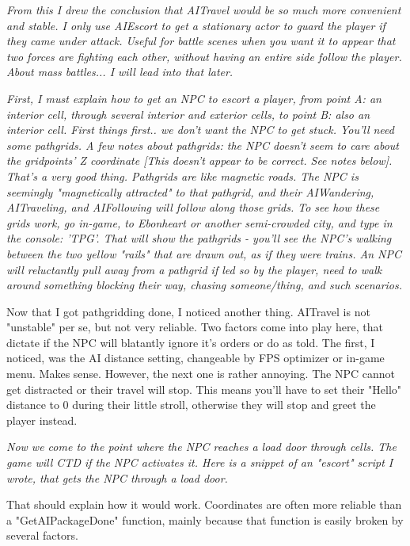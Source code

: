 \documentclass[
]{article}
\begin{document}
\emph{From this I drew the conclusion that AITravel would be so much
more convenient and stable. I only use AIEscort to get a stationary
actor to guard the player if they came under attack. Useful for battle
scenes when you want it to appear that two forces are fighting each
other, without having an entire side follow the player. About mass
battles... I will lead into that later.}

\emph{\hfill\break
First, I must explain how to get an NPC to escort a player, from point
A: an interior cell, through several interior and exterior cells, to
point B: also an interior cell. First things first.. we don't want the
NPC to get stuck. You'll need some pathgrids. A few notes about
pathgrids: the NPC doesn't seem to care about the gridpoints' Z
coordinate {[}This doesn't appear to be correct. See notes below{]}.
That's a very good thing. Pathgrids are like magnetic roads. The NPC is
seemingly "magnetically attracted" to that pathgrid, and their
AIWandering, AITraveling, and AIFollowing will follow along those grids.
To see how these grids work, go in-game, to Ebonheart or another
semi-crowded city, and type in the console: 'TPG'. That will show the
pathgrids - you'll see the NPC's walking between the two yellow "rails"
that are drawn out, as if they were trains. An NPC will reluctantly pull
away from a pathgrid if led so by the player, need to walk around
something blocking their way, chasing someone/thing, and such
scenarios.}

Now that I got pathgridding done, I noticed another thing. AITravel is
not "unstable" per se, but not very reliable. Two factors come into play
here, that dictate if the NPC will blatantly ignore it's orders or do as
told. The first, I noticed, was the AI distance setting, changeable by
FPS optimizer or in-game menu. Makes sense. However, the next one is
rather annoying. The NPC cannot get distracted or their travel will
stop. This means you'll have to set their "Hello" distance to 0 during
their little stroll, otherwise they will stop and greet the player
instead.

\emph{\hfill\break
Now we come to the point where the NPC reaches a load door through
cells. The game will CTD if the NPC activates it. Here is a snippet of
an "escort" script I wrote, that gets the NPC through a load door.}



That should explain how it would work. Coordinates are often more
reliable than a "GetAIPackageDone" function, mainly because that
function is easily broken by several factors.
\end{document}
